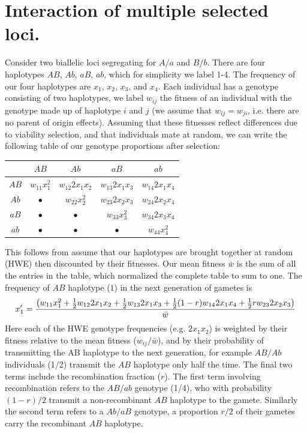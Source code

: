 \chapter{Interaction of multiple selected loci.}

Consider two biallelic loci segregating for $A/a$ and $B/b$. There are four haplotypes $AB$, $Ab$, $aB$, $ab$, which for simplicity we label 1-4. The frequency of our four haplotypes are $x_1$, $x_2$, $x_3$, and $x_4$. Each individual has a genotype consisting of two haplotypes, we label $w_{ij}$ the fitness of an individual with the genotype made up of haplotype $i$ and $j$ (we assume that $w_{ij}=w_{ji}$, i.e. there are no parent of origin effects). Assuming that these fitnesses reflect differences due to viability selection, and that individuals mate at random, we can write the following table of our genotype proportions after selection:\\
\begin{center}
\begin{tabular}{c|cccc}
         & $AB$			& $Ab$				& $aB$				& $ab$\\
\hline
$AB$ & $w_{11} x_1^2$ 	& $w_{12} 2 x_1 x_2$  	& $w_{13} 2 x_1 x_3$ 	& $w_{14} 2 x_1 x_4$ \\
$Ab$ & $\bullet$ 	  	& $w_{22} x_2^2$ 	  	& $w_{23} 2 x_2 x_3$  	& $w_{24} 2 x_2 x_4$ \\  
$aB$ & $\bullet$ 		& $\bullet$ 			& $w_{33} x_3^2$ 	  	& $w_{34} 2 x_3 x_4$ \\  
$ab$ & $\bullet$ 		& $\bullet$			& $\bullet$ 			&  $w_{44} x_4^2$ \\
\end{tabular}
\end{center}
This follows from assume that our haplotypes are brought together at random (HWE) then discounted by their fitnesses. Our mean fitness $\bar{w}$ is the sum of all the entries in the table, which normalized the complete table to sum to one. The frequency of $AB$ haplotype ($1$) in the next generation of gametes is
\begin{equation}
x_1' = \frac{\big( w_{11} x_1^2 +	 \tfrac{1}{2} w_{12} 2 x_1 x_2  + \tfrac{1}{2} w_{13} 2x_1 x_3  +	 \tfrac{1}{2} (1-r) w_{14} 2 x_1 x_4 + \tfrac{1}{2} r w_{23} 2 x_2 x_3   \big)}{ \bar{w} } \label{eqn:hapfreq}
\end{equation}
Here each of the HWE genotype frequencies (e.g. $2x_1x_2$) is weighted by their fitness relative to the mean fitness ($w_{ij}/\bar{w}$), and by their probability of transmitting the AB haplotype to the next generation, for example $AB/Ab$ individuals (1/2) transmit the $AB$ haplotype only half the time. The final two terms include the recombination fraction ($r$). The first term involving recombination refers to the $AB/ab$ genotype (1/4), who with probability $(1-r)/2$ transmit a non-recombinant $AB$ haplotype to the gamete. Similarly the second term refers to a  $Ab/aB$ genotype, a proportion $r/2$ of their gametes carry the recombinant $AB$ haplotype. 

